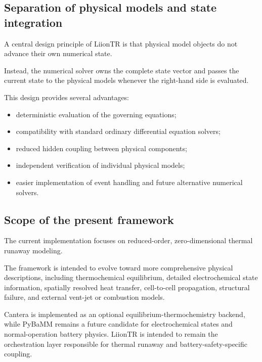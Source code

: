 \subsection{Separation of physical models and state integration}

A central design principle of LiionTR is that physical model objects do
not advance their own numerical state.

Instead, the numerical solver owns the complete state vector and passes
the current state to the physical models whenever the right-hand side is
evaluated.

This design provides several advantages:

\begin{itemize}
    \item deterministic evaluation of the governing equations;
    \item compatibility with standard ordinary differential equation
          solvers;
    \item reduced hidden coupling between physical components;
    \item independent verification of individual physical models;
    \item easier implementation of event handling and future alternative
          numerical solvers.
\end{itemize}


\subsection{Scope of the present framework}

The current implementation focuses on reduced-order, zero-dimensional
thermal runaway modeling.

The framework is intended to evolve toward more comprehensive physical
descriptions, including thermochemical equilibrium, detailed
electrochemical state information, spatially resolved heat transfer,
cell-to-cell propagation, structural failure, and external vent-jet or
combustion models.

Cantera is implemented as an optional equilibrium-thermochemistry backend,
while PyBaMM remains a future candidate for electrochemical states and
normal-operation battery physics.
LiionTR is intended to remain the orchestration layer responsible for
thermal runaway and battery-safety-specific coupling.